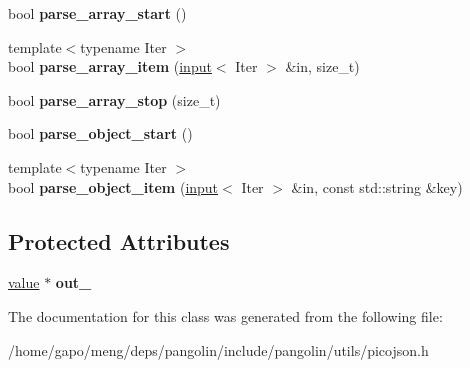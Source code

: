 \begin{DoxyCompactItemize}
\item 
bool {\bfseries parse\+\_\+array\+\_\+start} ()\hypertarget{classpangolin_1_1json_1_1default__parse__context_ab15b26550a48dfd7e5899f64cce12fca}{}\label{classpangolin_1_1json_1_1default__parse__context_ab15b26550a48dfd7e5899f64cce12fca}

\item 
{\footnotesize template$<$typename Iter $>$ }\\bool {\bfseries parse\+\_\+array\+\_\+item} (\hyperlink{classpangolin_1_1json_1_1input}{input}$<$ Iter $>$ \&in, size\+\_\+t)\hypertarget{classpangolin_1_1json_1_1default__parse__context_a13a6957921e6ba263747b6dcb08cd16d}{}\label{classpangolin_1_1json_1_1default__parse__context_a13a6957921e6ba263747b6dcb08cd16d}

\item 
bool {\bfseries parse\+\_\+array\+\_\+stop} (size\+\_\+t)\hypertarget{classpangolin_1_1json_1_1default__parse__context_afabdccf7cc8e6991e89da4a6aff61c9a}{}\label{classpangolin_1_1json_1_1default__parse__context_afabdccf7cc8e6991e89da4a6aff61c9a}

\item 
bool {\bfseries parse\+\_\+object\+\_\+start} ()\hypertarget{classpangolin_1_1json_1_1default__parse__context_ad57675e3a502e1acb7f4c6f468689d60}{}\label{classpangolin_1_1json_1_1default__parse__context_ad57675e3a502e1acb7f4c6f468689d60}

\item 
{\footnotesize template$<$typename Iter $>$ }\\bool {\bfseries parse\+\_\+object\+\_\+item} (\hyperlink{classpangolin_1_1json_1_1input}{input}$<$ Iter $>$ \&in, const std\+::string \&key)\hypertarget{classpangolin_1_1json_1_1default__parse__context_a036d4d89526823eaf09477b9e3752f0a}{}\label{classpangolin_1_1json_1_1default__parse__context_a036d4d89526823eaf09477b9e3752f0a}

\end{DoxyCompactItemize}
\subsection*{Protected Attributes}
\begin{DoxyCompactItemize}
\item 
\hyperlink{classpangolin_1_1json_1_1value}{value} $\ast$ {\bfseries out\+\_\+}\hypertarget{classpangolin_1_1json_1_1default__parse__context_aefcbed9ccab67eda862c46f07296ac27}{}\label{classpangolin_1_1json_1_1default__parse__context_aefcbed9ccab67eda862c46f07296ac27}

\end{DoxyCompactItemize}


The documentation for this class was generated from the following file\+:\begin{DoxyCompactItemize}
\item 
/home/gapo/meng/deps/pangolin/include/pangolin/utils/picojson.\+h\end{DoxyCompactItemize}
